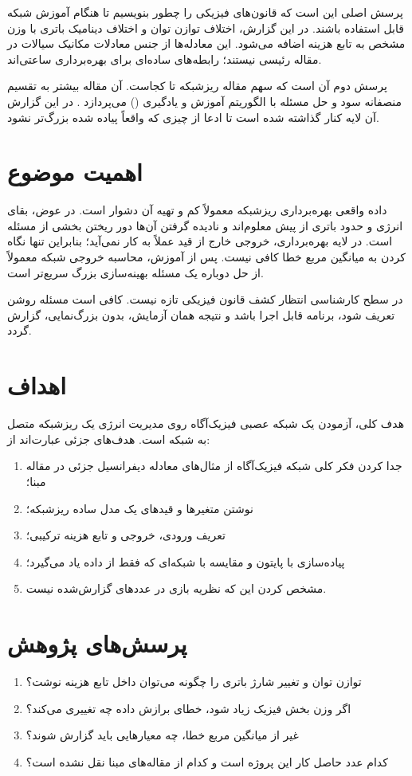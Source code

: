 پرسش اصلی این است که قانون‌های فیزیکی را چطور بنویسیم تا هنگام آموزش شبکه قابل استفاده باشند. در این گزارش، اختلاف توازن توان و اختلاف دینامیک باتری با وزن مشخص به تابع هزینه اضافه می‌شود. این معادله‌ها از جنس معادلات مکانیک سیالات در مقاله رئیسی نیستند؛ رابطه‌های ساده‌ای برای بهره‌برداری ساعتی‌اند.

پرسش دوم آن است که سهم مقاله ریزشبکه تا کجاست. آن مقاله بیشتر به تقسیم منصفانه سود و حل مسئله با الگوریتم آموزش و یادگیری () می‌پردازد . در این گزارش آن لایه کنار گذاشته شده است تا ادعا از چیزی که واقعاً پیاده شده بزرگ‌تر نشود.

\section{اهمیت موضوع}
داده واقعی بهره‌برداری ریزشبکه معمولاً کم و تهیه آن دشوار است. در عوض، بقای انرژی و حدود باتری از پیش معلوم‌اند و نادیده گرفتن آن‌ها دور ریختن بخشی از مسئله است. در لایه بهره‌برداری، خروجی خارج از قید عملاً به کار نمی‌آید؛ بنابراین تنها نگاه کردن به میانگین مربع خطا کافی نیست. پس از آموزش، محاسبه خروجی شبکه معمولاً از حل دوباره یک مسئله بهینه‌سازی بزرگ سریع‌تر است.

در سطح کارشناسی انتظار کشف قانون فیزیکی تازه نیست. کافی است مسئله روشن تعریف شود، برنامه قابل اجرا باشد و نتیجه همان آزمایش، بدون بزرگ‌نمایی، گزارش گردد.

\section{اهداف}
هدف کلی، آزمودن یک شبکه عصبی فیزیک‌آگاه روی مدیریت انرژی یک ریزشبکه متصل به شبکه است. هدف‌های جزئی عبارت‌اند از:
\begin{enumerate}
  \item جدا کردن فکر کلی شبکه فیزیک‌آگاه از مثال‌های معادله دیفرانسیل جزئی در مقاله مبنا؛
  \item نوشتن متغیرها و قیدهای یک مدل ساده ریزشبکه؛
  \item تعریف ورودی، خروجی و تابع هزینه ترکیبی؛
  \item پیاده‌سازی با پایتون و مقایسه با شبکه‌ای که فقط از داده یاد می‌گیرد؛
  \item مشخص کردن این که نظریه بازی در عددهای گزارش‌شده نیست.
\end{enumerate}

\section{پرسش‌های پژوهش}
\begin{enumerate}
  \item توازن توان و تغییر شارژ باتری را چگونه می‌توان داخل تابع هزینه نوشت؟
  \item اگر وزن بخش فیزیک زیاد شود، خطای برازش داده چه تغییری می‌کند؟
  \item غیر از میانگین مربع خطا، چه معیارهایی باید گزارش شوند؟
  \item کدام عدد حاصل کار این پروژه است و کدام از مقاله‌های مبنا نقل نشده است؟
\end{enumerate}

